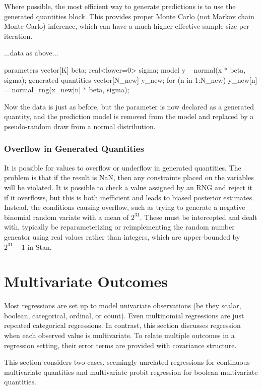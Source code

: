 Where possible, the most efficient way to generate predictions is to
use the generated quantities block.  This provides proper Monte Carlo
(not Markov chain Monte Carlo) inference, which can have a much higher
effective sample size per iteration.
%
\begin{stancode}
...data as above...

parameters {
  vector[K] beta;
  real<lower=0> sigma;
}
model {
  y ~ normal(x * beta, sigma);         
}
generated quantities {
  vector[N_new] y_new;  
  for (n in 1:N_new)
    y_new[n] = normal_rng(x_new[n] * beta, sigma);
}
\end{stancode}
%
Now the data is just as before, but the parameter  is now
declared as a generated quantity, and the prediction model is
removed from the model and replaced by a pseudo-random draw from a
normal distribution.

\subsubsection{Overflow in Generated Quantities}

It is possible for values to overflow or underflow in generated
quantities.  The problem is that if the result is NaN, then any
constraints placed on the variables will be violated.  It is possible
to check a value assigned by an RNG and reject it if it overflows, but
this is both inefficient and leads to biased posterior estimates.
Instead, the conditions causing overflow, such as trying to generate a
negative binomial random variate with a mean of $2^{31}$.  These must
be intercepted and dealt with, typically be reparameterizing or
reimplementing the random number geneator using real values rather
than integers, which are upper-bounded by $2^{31} - 1$ in Stan.
  

\section{Multivariate Outcomes}

Most regressions are set up to model univariate observations (be they
scalar, boolean, categorical, ordinal, or count).  Even multinomial
regressions are just repeated categorical regressions.  In contrast,
this section discusses regression when each observed value is
multivariate.  To relate multiple outcomes in a regression setting,
their error terms are provided with covariance structure.  

This section considers two cases, seemingly unrelated regressions for
continuous multivariate quantities and multivariate probit regression
for boolean multivariate quantities.

